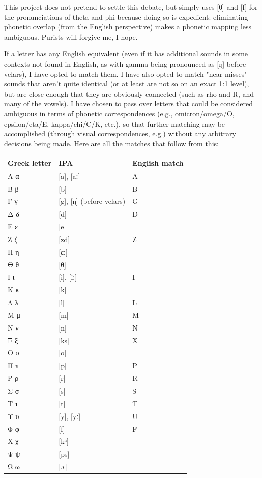 \documentclass[11pt]{article}
\begin{document}
This project does not pretend to settle this debate, but simply uses [θ] and [f] for the pronunciations of theta and phi because doing so is expedient: eliminating phonetic overlap (from the English perspective) makes a phonetic mapping less ambiguous. Purists will forgive me, I hope.

If a letter has any English equivalent (even if it has additional sounds in some contexts not found in English, as with gamma being pronounced as [ŋ] before velars), I have opted to match them. I have also opted to match "near misses" -- sounds that aren't quite identical (or at least are not so on an exact 1:1 level), but are close enough that they are obviously connected (such as rho and R, and many of the vowels). I have chosen to pass over letters that could be considered ambiguous in terms of phonetic correspondences (e.g., omicron/omega/O, epsilon/eta/E, kappa/chi/C/K, etc.), so that further matching may be accomplished (through visual correspondences, e.g.) without any arbitrary decisions being made. Here are all the matches that follow from this:

\begin{center}
\begin{tabular}{lll}
Greek letter & IPA & English match\\
\hline
Α α & [a], [aː] & A\\
Β β & [b] & B\\
Γ γ & [g], [ŋ] (before velars) & G\\
Δ δ & [d] & D\\
Ε ε & [e] & \\
Ζ ζ & [zd] & Z\\
Η η & [ɛː] & \\
Θ θ & [θ] & \\
Ι ι & [i], [iː] & I\\
Κ κ & [k] & \\
Λ λ & [l] & L\\
Μ μ & [m] & M\\
Ν ν & [n] & N\\
Ξ ξ & [ks] & X\\
Ο ο & [o] & \\
Π π & [p] & P\\
Ρ ρ & [r] & R\\
Σ σ & [s] & S\\
Τ τ & [t] & T\\
Υ υ & [y], [yː] & U\\
Φ φ & [f] & F\\
Χ χ & [kʰ] & \\
Ψ ψ & [ps] & \\
Ω ω & [ɔː] & \\
\end{tabular}
\end{center}
\end{document}
